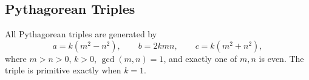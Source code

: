 \subsection{Pythagorean Triples}

All Pythagorean triples are generated by
\[
    a = k(m^2 - n^2), \qquad
    b = 2kmn, \qquad
    c = k(m^2 + n^2),
\]
where $m > n > 0$, $k > 0$, $\gcd(m,n)=1$, and exactly one of
$m,n$ is even. The triple is primitive exactly when $k=1$.
